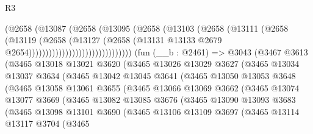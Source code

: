 \begin{lexlean}{R3}
\begin{coremodule}
                                      (@2658
                                        (@13087
                                          (@2658
                                            (@13095
                                              (@2658
                                                (@13103
                                                  (@2658
                                                    (@13111
                                                      (@2658
                                                        (@13119
                                                          (@2658
                                                            (@13127
                                                              (@2658
                                                                (@13131
                                                                  @13133
                                                                  @2679
                                                                  @2654)))))))))))))))))))))))))))))))
    (fun (__b : @2461) =>
    @3043
      (@3467
        @3613
        (@3465
          @13018
          @13021
          @3620
          (@3465
            @13026
            @13029
            @3627
            (@3465
              @13034
              @13037
              @3634
              (@3465
                @13042
                @13045
                @3641
                (@3465
                  @13050
                  @13053
                  @3648
                  (@3465
                    @13058
                    @13061
                    @3655
                    (@3465
                      @13066
                      @13069
                      @3662
                      (@3465
                        @13074
                        @13077
                        @3669
                        (@3465
                          @13082
                          @13085
                          @3676
                          (@3465
                            @13090
                            @13093
                            @3683
                            (@3465
                              @13098
                              @13101
                              @3690
                              (@3465
                                @13106
                                @13109
                                @3697
                                (@3465
                                  @13114
                                  @13117
                                  @3704
                                  (@3465

\end{coremodule}
\end{lexlean}
